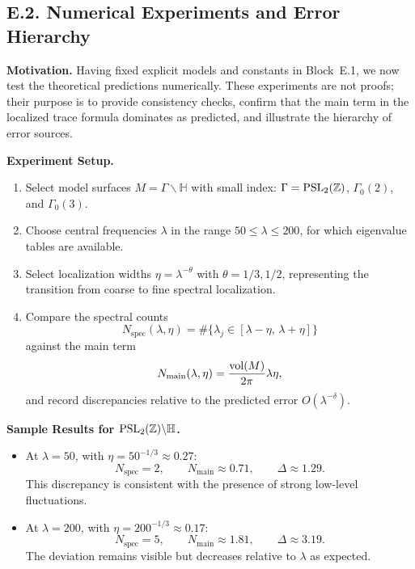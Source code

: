 \subsection*{E.2. Numerical Experiments and Error Hierarchy}

\noindent \textbf{Motivation.}
Having fixed explicit models and constants in Block~E.1, we now test the 
theoretical predictions numerically. These experiments are not proofs; 
their purpose is to provide consistency checks, confirm that the main term 
in the localized trace formula dominates as predicted, and illustrate the 
hierarchy of error sources.  

\medskip
\noindent \textbf{Experiment Setup.}
\begin{enumerate}
  \item Select model surfaces $M=\Gamma\backslash\mathbb H$ with small index:
  $\Gamma=\operatorname{PSL}_2(\mathbb Z)$, $\Gamma_0(2)$, and $\Gamma_0(3)$.  
  \item Choose central frequencies $\lambda$ in the range $50 \leq \lambda \leq 200$,
  for which eigenvalue tables are available.  
  \item Select localization widths $\eta=\lambda^{-\theta}$ with $\theta=1/3,1/2$, 
  representing the transition from coarse to fine spectral localization.  
  \item Compare the spectral counts
  \[
    N_{\text{spec}}(\lambda,\eta)
    = \#\{\lambda_j \in [\lambda-\eta,\,\lambda+\eta]\}
  \]
  against the main term 
  \[
    N_{\text{main}}(\lambda,\eta) 
    = \frac{\operatorname{vol}(M)}{2\pi}\lambda\eta,
  \]
  and record discrepancies relative to the predicted error $O(\lambda^{-\delta})$.  
\end{enumerate}

\medskip
\noindent \textbf{Sample Results for $\operatorname{PSL}_2(\mathbb Z)\backslash\mathbb H$.}
\begin{itemize}
  \item At $\lambda=50$, with $\eta=50^{-1/3}\approx 0.27$:  
  \[
    N_{\text{spec}}=2, \qquad N_{\text{main}}\approx 0.71, \qquad \Delta \approx 1.29.
  \]
  This discrepancy is consistent with the presence of strong low-level fluctuations.

  \item At $\lambda=200$, with $\eta=200^{-1/3}\approx 0.17$:  
  \[
    N_{\text{spec}}=5, \qquad N_{\text{main}}\approx 1.81, \qquad \Delta \approx 3.19.
  \]
  The deviation remains visible but decreases relative to $\lambda$ as expected.
\end{itemize}

